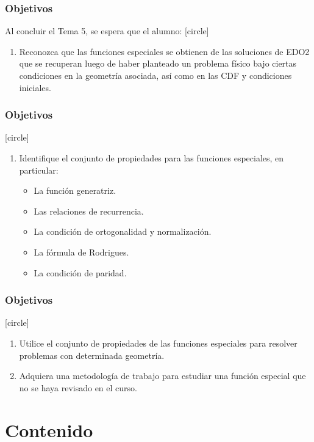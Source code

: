 \documentclass[12pt]{beamer}
\begin{document}
\begin{frame}
\frametitle{Objetivos}
Al concluir el Tema 5, se espera que el alumno:
[circle]
\begin{enumerate}[<+->]
\item Reconozca que las funciones especiales se obtienen de las soluciones de EDO2 que se recuperan luego de haber planteado un problema físico bajo ciertas condiciones en la geometría asociada, así como en las CDF y condiciones iniciales.                            
\seti
\end{enumerate}
\end{frame}
\begin{frame}
\frametitle{Objetivos}
[circle]
\begin{enumerate}[<+->]
\conti
\item Identifique el conjunto de propiedades para las funciones especiales, en particular:
\begin{itemize}
\item La función generatriz.
\item Las relaciones de recurrencia.
\item La condición de ortogonalidad y normalización.
\item La fórmula de Rodrigues.
\item La condición de paridad.
\end{itemize}
\seti
\end{enumerate}
\end{frame}
\begin{frame}
\frametitle{Objetivos}
[circle]
\begin{enumerate}[<+->]
\conti
\item Utilice el conjunto de propiedades de las funciones especiales para resolver problemas con determinada geometría.
\item Adquiera una metodología de trabajo para estudiar una función especial que no se haya revisado en el curso.
\end{enumerate}
\end{frame}

\section{Contenido}
\end{document}
